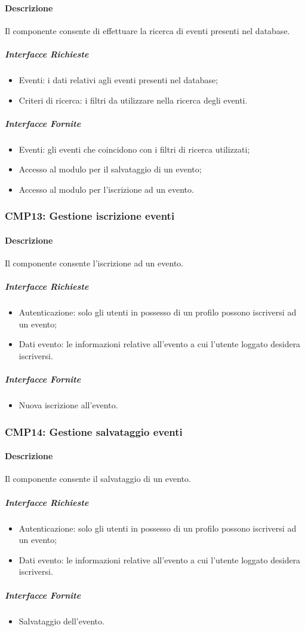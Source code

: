\documentclass[9pt]{extarticle}
\begin{document}
\paragraph{Descrizione}
Il componente consente di effettuare la ricerca di eventi presenti nel database.
\subparagraph{Interfacce Richieste}
\begin{itemize}
	\item Eventi: i dati relativi agli eventi presenti nel database;
	\item Criteri di ricerca: i filtri da utilizzare nella ricerca degli eventi.
\end{itemize}
\subparagraph{Interfacce Fornite}
\begin{itemize}
	\item Eventi: gli eventi che coincidono con i filtri di ricerca utilizzati;
	\item Accesso al modulo per il salvataggio di un evento;
	\item Accesso al modulo per l'iscrizione ad un evento.
\end{itemize}

\subsubsection*{CMP13: Gestione iscrizione eventi}
\paragraph{Descrizione}
Il componente consente l'iscrizione ad un evento.
\subparagraph{Interfacce Richieste}
\begin{itemize}
	\item Autenticazione: solo gli utenti in possesso di un profilo possono iscriversi ad un evento;
	\item Dati evento: le informazioni relative all'evento a cui l'utente loggato desidera iscriversi.
\end{itemize}
\subparagraph{Interfacce Fornite}
\begin{itemize}
	\item Nuova iscrizione all'evento.
\end{itemize}

\subsubsection*{CMP14: Gestione salvataggio eventi}
\paragraph{Descrizione}
Il componente consente il salvataggio di un evento.
\subparagraph{Interfacce Richieste}
\begin{itemize}
	\item Autenticazione: solo gli utenti in possesso di un profilo possono iscriversi ad un evento;
	\item Dati evento: le informazioni relative all'evento a cui l'utente loggato desidera iscriversi.
\end{itemize}
\subparagraph{Interfacce Fornite}
\begin{itemize}
	\item Salvataggio dell'evento.
\end{itemize}
\end{document}
